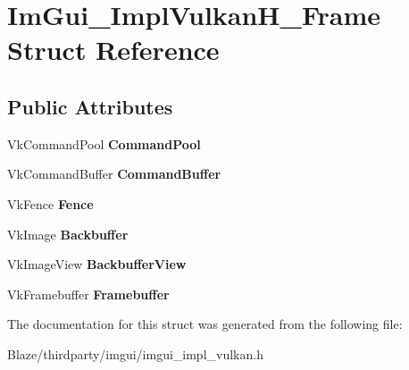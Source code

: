 \hypertarget{structImGui__ImplVulkanH__Frame}{}\section{Im\+Gui\+\_\+\+Impl\+Vulkan\+H\+\_\+\+Frame Struct Reference}
\label{structImGui__ImplVulkanH__Frame}
\subsection*{Public Attributes}
\begin{DoxyCompactItemize}
\item 
\mbox{\label{structImGui__ImplVulkanH__Frame_a6c911e80ef74061af078068943e8f0e3}} 
Vk\+Command\+Pool {\bfseries Command\+Pool}
\item 
\mbox{\label{structImGui__ImplVulkanH__Frame_a18aaf1c0c5df6cec2a8de6e35da5c7c7}} 
Vk\+Command\+Buffer {\bfseries Command\+Buffer}
\item 
\mbox{\label{structImGui__ImplVulkanH__Frame_a320898ead11e93ed043ee9bce405176a}} 
Vk\+Fence {\bfseries Fence}
\item 
\mbox{\label{structImGui__ImplVulkanH__Frame_a9319c32a4da6914a275336f6097f2f23}} 
Vk\+Image {\bfseries Backbuffer}
\item 
\mbox{\label{structImGui__ImplVulkanH__Frame_a6f0c15150471d42253c5873f393cfc57}} 
Vk\+Image\+View {\bfseries Backbuffer\+View}
\item 
\mbox{\label{structImGui__ImplVulkanH__Frame_a31f96a2c02a2e037278bf0ec144c6077}} 
Vk\+Framebuffer {\bfseries Framebuffer}
\end{DoxyCompactItemize}


The documentation for this struct was generated from the following file\+:\begin{DoxyCompactItemize}
\item 
Blaze/thirdparty/imgui/imgui\+\_\+impl\+\_\+vulkan.\+h\end{DoxyCompactItemize}
